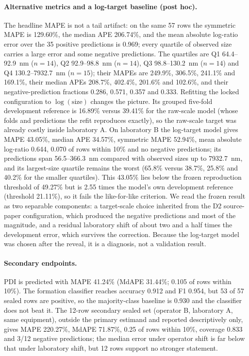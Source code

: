 \documentclass[11pt,a4paper]{article}
\begin{document}
\paragraph{Alternative metrics and a log-target baseline (post hoc).} The
headline MAPE is not a tail artifact: on the same 57 rows the symmetric MAPE
is 129.60\%, the median APE 206.74\%, and the mean absolute log-ratio error
over the 35 positive predictions is 0.969; every quartile of observed size
carries a large error and some negative predictions. The quartiles are Q1
64.4--92.9~nm ($n=14$), Q2 92.9--98.8~nm ($n=14$), Q3 98.8--130.2~nm
($n=14$) and Q4 130.2--7932.7~nm ($n=15$); their MAPEs are 249.9\%, 306.5\%,
241.1\% and 169.1\%, their median APEs 208.7\%, 402.4\%, 201.6\% and 102.6\%,
and their negative-prediction fractions 0.286, 0.571, 0.357 and 0.333.
Refitting the locked configuration to
$\log(\mathrm{size})$ changes the picture. Its grouped five-fold development
reference is 16.89\% versus 39.41\% for the raw-scale model (whose folds and
predictions the refit reproduces exactly), so the raw-scale target was
already costly inside laboratory A. On laboratory B the log-target model
gives MAPE 43.05\%, median APE 34.57\%, symmetric MAPE 52.94\%, mean absolute
log-ratio 0.644, 0.070 of rows within 10\% and no negative predictions; its
predictions span 56.5--366.3~nm compared with observed sizes up to 7932.7~nm, and
its largest-size quartile remains the worst (65.8\% versus 38.7\%, 25.8\%
and 40.2\% for the smaller quartiles). This 43.05\% lies below the frozen
reproduction threshold of 49.27\% but is 2.55 times the model's own
development reference (threshold 21.11\%), so it fails the like-for-like
criterion. We read the frozen result as two separable components: a
target-scale choice inherited from the D2 source-paper configuration, which
produced the negative predictions and most of the magnitude, and a residual
laboratory shift of about two and a half times the development error, which
survives the correction. Because the log-target model was chosen after the
reveal, it is a diagnosis, not a validation result.

\paragraph{Secondary endpoints.} PDI is predicted with MAPE 41.24\% (MdAPE
31.44\%; 0.105 of rows within 10\%). The formation classifier reaches
accuracy 0.912 and F1 0.954, but 53 of 57 sealed rows are positive, so the
majority-class baseline is 0.930 and the classifier does not beat it. The
12-row secondary sealed set (operator B, laboratory A, same equipment),
outside the primary estimand and reported descriptively only, gives MAPE
220.27\%, MdAPE 71.87\%, 0.25 of rows within 10\%, coverage 0.833 and 3/12
negative predictions; the median error under operator shift is far below that
under laboratory shift, but 12 rows support no stronger statement.
\end{document}
